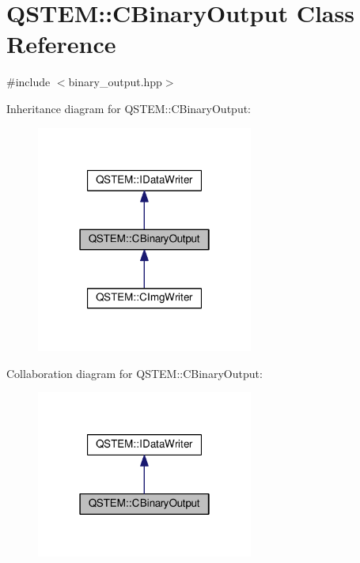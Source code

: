\hypertarget{class_q_s_t_e_m_1_1_c_binary_output}{\section{Q\-S\-T\-E\-M\-:\-:C\-Binary\-Output Class Reference}
\label{class_q_s_t_e_m_1_1_c_binary_output}
}


{\ttfamily \#include $<$binary\-\_\-output.\-hpp$>$}



Inheritance diagram for Q\-S\-T\-E\-M\-:\-:C\-Binary\-Output\-:
\nopagebreak
\begin{figure}[H]
\begin{center}
\leavevmode
\includegraphics[width=202pt]{class_q_s_t_e_m_1_1_c_binary_output__inherit__graph}
\end{center}
\end{figure}


Collaboration diagram for Q\-S\-T\-E\-M\-:\-:C\-Binary\-Output\-:
\nopagebreak
\begin{figure}[H]
\begin{center}
\leavevmode
\includegraphics[width=202pt]{class_q_s_t_e_m_1_1_c_binary_output__coll__graph}
\end{center}
\end{figure}

